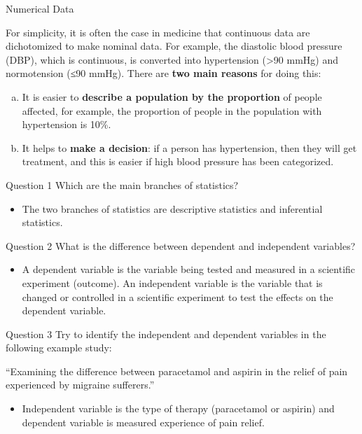 \documentclass[
  ignorenonframetext,
]{beamer}
\providecommand{\tightlist}{%
  \setlength{\itemsep}{0pt}\setlength{\parskip}{0pt}}\usepackage{longtable,booktabs,array}
\begin{document}
\begin{frame}{Numerical Data}
\begin{tcolorbox}
For simplicity, it is often the case in medicine that continuous data
are dichotomized to make nominal data. For example, the diastolic blood
pressure (DBP), which is continuous, is converted into hypertension
(\textgreater90 mmHg) and normotension (≤90 mmHg). There are \textbf{two
main reasons} for doing this:

\begin{enumerate}
[(a)]
\item
  It is easier to \textbf{describe a population by the proportion} of
  people affected, for example, the proportion of people in the
  population with hypertension is 10\%.
\item
  It helps to \textbf{make a decision}: if a person has hypertension,
  then they will get treatment, and this is easier if high blood
  pressure has been categorized.
\end{enumerate}

\end{tcolorbox}
\end{frame}

\begin{frame}{Question 1}
\protect\hypertarget{question-1}{}
Which are the main branches of statistics?

\begin{itemize}[<+->]
\tightlist
\item
  {The two branches of statistics are descriptive statistics and
  inferential statistics.}
\end{itemize}
\end{frame}

\begin{frame}{Question 2}
\protect\hypertarget{question-2}{}
What is the difference between dependent and independent variables?

\begin{itemize}[<+->]
\tightlist
\item
  {A dependent variable is the variable being tested and measured in a
  scientific experiment (outcome). An independent variable is the
  variable that is changed or controlled in a scientific experiment to
  test the effects on the dependent variable.}
\end{itemize}
\end{frame}

\begin{frame}{Question 3}
\protect\hypertarget{question-3}{}
Try to identify the independent and dependent variables in the following
example study:

``Examining the difference between paracetamol and aspirin in the relief
of pain experienced by migraine sufferers.''

\begin{itemize}[<+->]
\tightlist
\item
  {Independent variable is the type of therapy (paracetamol or aspirin)
  and dependent variable is measured experience of pain relief.}
\end{itemize}
\end{frame}
\end{document}

